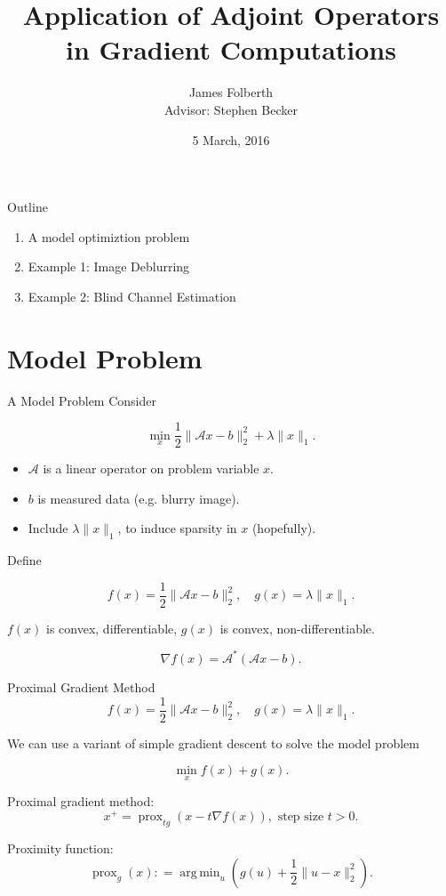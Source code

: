 \documentclass[xcolor=dvipsnames,t]{beamer} %
\title{Application of Adjoint Operators in Gradient Computations}
\date{5 March, 2016}
\author{James Folberth\\Advisor: Stephen Becker}
\institute{University of Colorado at Boulder}
\newcommand{\defeq}{\mathrel{\mathop:}=}
\DeclareMathOperator*{\argmin}{arg\,min}
\begin{document}
\begin{frame}
\maketitle
\end{frame}

\begin{frame}{Outline}
   \begin{enumerate}
      \item A model optimiztion problem
      \item Example 1: Image Deblurring
      \item Example 2: Blind Channel Estimation
   \end{enumerate}


\end{frame}

\section{Model Problem}
\begin{frame}{A Model Problem}
   Consider

   \[ \min_x \dfrac{1}{2}\|\mathcal{A}x-b\|_2^2 + \lambda \|x\|_1. \] 

   \begin{itemize}
      \item $\mathcal{A}$ is a linear operator on problem variable $x$.
      \item $b$ is measured data (e.g. blurry image).
      \item Include $\lambda \|x\|_1$, to induce sparsity in $x$ (hopefully).
   \end{itemize}

   Define 

   \[ f(x) = \dfrac{1}{2}\|\mathcal{A}x-b\|_2^2, \quad g(x) = \lambda \|x\|_1. \] 

   \noindent $f(x)$ is convex, differentiable, $g(x)$ is convex, non-differentiable.
   
   \[ \nabla f(x) = \mathcal{A}^\ast\left(\mathcal{A}x-b\right). \] 

\end{frame}

\begin{frame}{Proximal Gradient Method}
   \[ f(x) = \dfrac{1}{2}\|\mathcal{A}x-b\|_2^2, \quad g(x) = \lambda \|x\|_1. \] 

   We can use a variant of simple gradient descent to solve the model problem

   \[ \min_x f(x) + g(x). \] 

   Proximal gradient method:
   \[ x^{+} = \operatorname{prox}_{t g}\left(x - t\nabla f(x)\right), \text{ step size $t>0$}. \] 
   
   Proximity function: 
   \[ \operatorname{prox}_g(x) \defeq \argmin_u\left(g(u) + \dfrac{1}{2}\|u-x\|_2^2\right). \] 

\end{frame}
\end{document}
